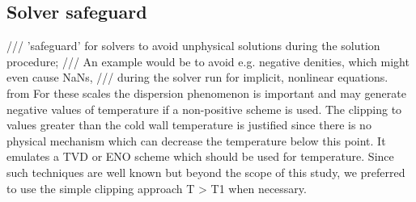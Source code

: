 \subsection{Solver safeguard}
/// 'safeguard' for solvers to avoid unphysical solutions during the solution procedure;
/// An example would be to avoid e.g. negative denities, which might even cause NaNs,
/// during the solver run for implicit, nonlinear equations.
from \textcite{nicoudConservativeHighOrderFiniteDifference2000}
 For these scales the dispersion phenomenon is important
and may generate negative values of temperature if a non-positive scheme
is used. The clipping to values greater than the cold wall temperature is
justified since there is no physical mechanism which can decrease the temperature below this point. It emulates a TVD or ENO scheme which should
be used for temperature. Since such techniques are well known but beyond
the scope of this study, we preferred to use the simple clipping approach
T > T1 when necessary. 
